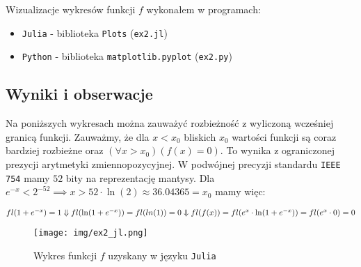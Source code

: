 \documentclass[12pt]{article}
\begin{document}
        \noindent \newline Wizualizacje wykresów funkcji $f$ wykonałem w programach:
        \begin{itemize}
            \item \texttt{Julia} - biblioteka \texttt{Plots} (\texttt{ex2.jl})
            \item \texttt{Python} - biblioteka \texttt{matplotlib.pyplot} (\texttt{ex2.py})
        \end{itemize}

        \noindent \newline

    \subsection*{Wyniki i obserwacje}
        Na poniższych wykresach można zauważyć rozbieżność z wyliczoną wcześniej granicą funkcji. Zauważmy, że dla $x < x_0$ bliskich $x_0$ wartości funkcji są coraz bardziej rozbieżne oraz $(\forall x > x_0)(f(x) = 0)$.
        \newline\newline
        To wynika z ograniczonej prezycji arytmetyki zmiennopozycyjnej. W podwójnej precyzji standardu \texttt{IEEE 754} mamy $52$ bity na reprezentację mantysy.
        \newline\newline
        Dla $e^{-x} < 2^{-52} \implies x > 52 \cdot \ln(2) \approx 36.04365 = x_0$ mamy więc:
        \begin{center}
        \begin{math}
            fl(1 + e^{-x}) = 1 \\
            \Downarrow \\
            fl(\ln(1 + e^{-x})) = fl(ln(1)) = 0 \\
            \Downarrow \\
            fl(f(x)) = fl(e^x \cdot \ln(1 + e^{-x})) = fl(e^x \cdot 0) = 0
        \end{math}
        \end{center}

        \newpage

        \begin{figure}[h!]
            \centering
            \texttt{[image: img/ex2\_jl.png]}
            \caption{Wykres funkcji $f$ uzyskany w języku \texttt{Julia}}
            \label{fig:ex2_jl}
        \end{figure}
\end{document}
